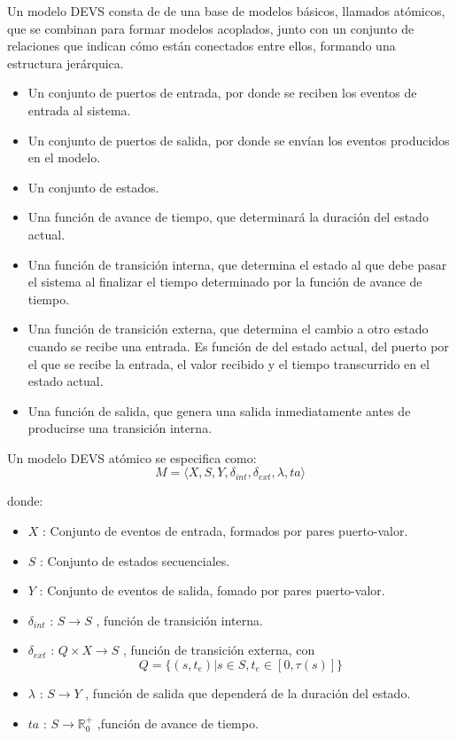 Un modelo DEVS consta de de una base de modelos básicos, llamados atómicos, que se combinan para formar modelos acoplados, junto con un conjunto de relaciones que indican cómo están conectados entre ellos, formando una estructura jerárquica.


\begin{itemize}
\item Un conjunto de puertos de entrada, por donde se reciben los eventos de entrada al sistema.
\item Un conjunto de puertos de salida, por donde se envían los eventos producidos en el modelo.
\item Un conjunto de estados.
\item Una función de avance de tiempo, que determinará la duración del estado actual.
\item Una función de transición interna, que determina el estado al que debe pasar el sistema al finalizar el tiempo determinado por la función de avance de tiempo.
\item Una función de transición externa, que determina el cambio a otro estado cuando se recibe una entrada. Es función de del estado actual, del puerto por el que se recibe la entrada, el valor recibido y el tiempo transcurrido en el estado actual.
\item Una función de salida, que genera una salida inmediatamente antes de producirse una transición interna.
\end{itemize}

Un modelo DEVS atómico se especifica como:
\begin{equation}\label{eq:DevsAtomic}
M = \langle X,S,Y,\delta_{int} , \delta_{ext} , \lambda, ta\rangle
\end{equation}

\noindent donde:

\begin{itemize}
\item $X$ : Conjunto de eventos de entrada, formados por pares puerto-valor.	
\item $S$ : Conjunto de estados secuenciales.
\item $Y$ : Conjunto de eventos de salida, fomado por pares puerto-valor.
\item $\delta_{int}$ : $S\rightarrow S$ , función de transición interna.
\item $\delta_{ext}$ : $Q\times X\rightarrow S$ , función de transición externa, con
\begin{equation}\label{eq:FullState}
Q = \lbrace(s,t_e) | s\in S, t_e\in [0,\tau (s)]\rbrace
\end{equation}
\item $\lambda$ : $S\rightarrow Y$ , función de salida que dependerá de la duración del estado.
\item $ta$ : $S\rightarrow \mathbb{R}^{+}_{0}$ ,función de avance de tiempo.
\end{itemize}

